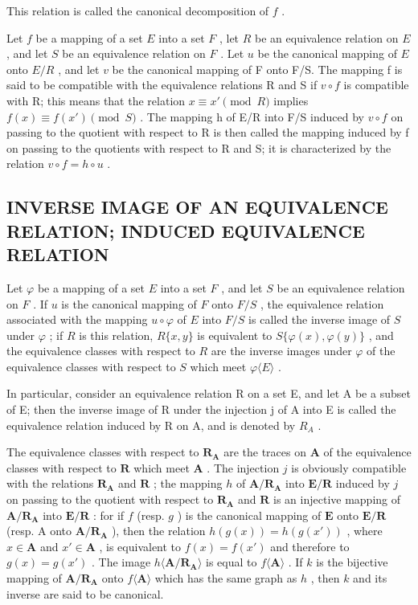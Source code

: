 This relation is called the canonical decomposition of \(f\) .

Let \(f\) be a mapping of a set \(E\) into a set \(F\) , let \(R\) be an equivalence relation on \(E\) , and let \(S\) be an equivalence relation on \(F\) . Let \(u\) be the canonical mapping of \(E\) onto \(E / R\) , and let \(v\) be the canonical mapping of F onto F/S. The mapping f is said to be compatible with the equivalence relations R and S if \(v \circ f\) is compatible with R; this means that the relation \(x \equiv x' \pmod{R}\) implies \(f(x) \equiv f(x') \pmod{S}\) . The mapping h of E/R into F/S induced by \(v \circ f\) on passing to the quotient with respect to R is then called the mapping induced by f on passing to the quotients with respect to R and S; it is characterized by the relation \(v \circ f = h \circ u\) .

\subsection{INVERSE IMAGE OF AN EQUIVALENCE RELATION; INDUCED EQUIVALENCE RELATION}

Let \(\varphi\) be a mapping of a set \(E\) into a set \(F\) , and let \(S\) be an equivalence relation on \(F\) . If \(u\) is the canonical mapping of \(F\) onto \(F/S\) , the equivalence relation associated with the mapping \(u \circ \varphi\) of \(E\) into \(F/S\) is called the inverse image of \(S\) under \(\varphi\) ; if \(R\) is this relation, \(R\{x, y\}\) is equivalent to \(S\{\varphi(x), \varphi(y)\}\) , and the equivalence classes with respect to \(R\) are the inverse images under \(\varphi\) of the equivalence classes with respect to \(S\) which meet \(\varphi\langle E\rangle\) .

In particular, consider an equivalence relation R on a set E, and let A be a subset of E; then the inverse image of R under the injection j of A into E is called the equivalence relation induced by R on A, and is denoted by \(R_{A}\) .

The equivalence classes with respect to \(\mathbf{R}_{\mathbf{A}}\) are the traces on \(\mathbf{A}\) of the equivalence classes with respect to \(\mathbf{R}\) which meet \(\mathbf{A}\) . The injection \(j\) is obviously compatible with the relations \(\mathbf{R}_{\mathbf{A}}\) and \(\mathbf{R}\) ; the mapping \(h\) of \(\mathbf{A} / \mathbf{R}_{\mathbf{A}}\) into \(\mathbf{E} / \mathbf{R}\) induced by \(j\) on passing to the quotient with respect to \(\mathbf{R}_{\mathbf{A}}\) and \(\mathbf{R}\) is an injective mapping of \(\mathbf{A} / \mathbf{R}_{\mathbf{A}}\) into \(\mathbf{E} / \mathbf{R}\) : for if \(f\) (resp. \(g\) ) is the canonical mapping of \(\mathbf{E}\) onto \(\mathbf{E} / \mathbf{R}\) (resp. A onto \(\mathbf{A} / \mathbf{R}_{\mathbf{A}}\) ), then the relation \(h(g(x)) = h(g(x'))\) , where \(x \in \mathbf{A}\) and \(x' \in \mathbf{A}\) , is equivalent to \(f(x) = f(x')\) and therefore to \(g(x) = g(x')\) . The image \(h\langle \mathbf{A} / \mathbf{R}_{\mathbf{A}} \rangle\) is equal to \(f\langle \mathbf{A} \rangle\) . If \(k\) is the bijective mapping of \(\mathbf{A} / \mathbf{R}_{\mathbf{A}}\) onto \(f\langle \mathbf{A} \rangle\) which has the same graph as \(h\) , then \(k\) and its inverse are said to be canonical.

